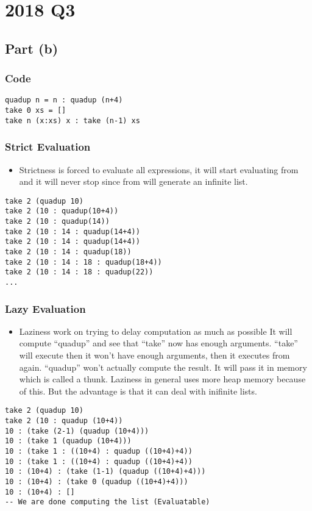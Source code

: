 \documentclass[11pt]{article}
\begin{document}
\section{2018 Q3}
\label{sec:org52a73bd}
\subsection{Part (b)}
\label{sec:org14db308}
\subsubsection{Code}
\label{sec:org1baf795}
\begin{verbatim}
quadup n = n : quadup (n+4)
take 0 xs = []
take n (x:xs) x : take (n-1) xs
\end{verbatim}
\subsubsection{Strict Evaluation}
\label{sec:org8965904}
\begin{itemize}
\item Strictness is forced to evaluate all expressions, it will start
evaluating from and it will never stop since from will generate
an infinite list.
\end{itemize}
\begin{verbatim}
take 2 (quadup 10)
take 2 (10 : quadup(10+4))
take 2 (10 : quadup(14))
take 2 (10 : 14 : quadup(14+4))
take 2 (10 : 14 : quadup(14+4))
take 2 (10 : 14 : quadup(18))
take 2 (10 : 14 : 18 : quadup(18+4))
take 2 (10 : 14 : 18 : quadup(22))
...
\end{verbatim}

\subsubsection{Lazy Evaluation}
\label{sec:org6db7d3c}
\begin{itemize}
\item Laziness work on trying to delay computation as much as possible
It will compute ``quadup'' and see that ``take'' now has enough arguments.
``take'' will execute then it won't have enough arguments, then it executes from
again. ``quadup'' won't actually compute the result. It will pass it in memory
which is called a thunk. Laziness in general uses more heap memory because of this.
But the advantage is that it can deal with inifinite lists.
\end{itemize}
\begin{verbatim}
take 2 (quadup 10)
take 2 (10 : quadup (10+4))
10 : (take (2-1) (quadup (10+4)))
10 : (take 1 (quadup (10+4)))
10 : (take 1 : ((10+4) : quadup ((10+4)+4))
10 : (take 1 : ((10+4) : quadup ((10+4)+4))
10 : (10+4) : (take (1-1) (quadup ((10+4)+4)))
10 : (10+4) : (take 0 (quadup ((10+4)+4)))
10 : (10+4) : []
-- We are done computing the list (Evaluatable)
\end{verbatim}
\newpage
\end{document}

